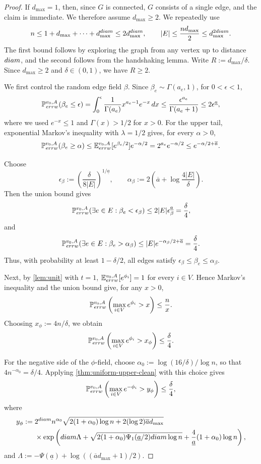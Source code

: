 \documentclass[10pt,a4paper]{amsart}
\newcommand{\E}{\mathbb{E}}
\newcommand{\Eerrw}{\E_{\textnormal{errw}}}
\renewcommand{\P}{\mathbb{P}}
\newcommand{\Perrw}{\P_{\textnormal{errw}}}
\newcommand{\diam}{\textnormal{diam}}
\begin{document}
\begin{proof}
If $d_{\max}=1$, then, since $G$ is connected, $G$ consists of a single edge, and the claim is immediate. We therefore assume $d_{\max}\ge2$. We repeatedly use
\[
n\le 1+d_{\max}+\cdots+d_{\max}^{\diam}\le 2d_{\max}^{\diam},
\qquad
|E|\le \frac{nd_{\max}}{2}\le d_{\max}^{2\diam}.
\]
The first bound follows by exploring the graph from any vertex up to distance $\diam$, and the second follows from the handshaking lemma. Write $R:=d_{\max}/\delta$. Since $d_{\max}\ge2$ and $\delta\in(0,1)$, we have $R\ge2$.

We first control the random edge field $\beta$. Since $\beta_e\sim\Gamma(a_e,1)$, for $0<\epsilon<1$,
\[
\Perrw^{v_0,A}(\beta_e\le \epsilon)
=
\int_0^\epsilon \frac{1}{\Gamma(a_e)}x^{a_e-1}e^{-x}\,dx
\le
\frac{\epsilon^{a_e}}{\Gamma(a_e+1)}
\le
2\epsilon^{\underline a},
\]
where we used $e^{-x}\le1$ and $\Gamma(x)>1/2$ for $x>0$. For the upper tail, exponential Markov's inequality with $\lambda=1/2$ gives, for every $\alpha>0$,
\[
\Perrw^{v_0,A}(\beta_e\ge\alpha)
\le
\Eerrw^{v_0,A}[e^{\beta_e/2}]e^{-\alpha/2}
=
2^{a_e}e^{-\alpha/2}
\le
e^{-\alpha/2+\overline a}.
\]

Choose
\[
\epsilon_\beta:=\left(\frac{\delta}{8|E|}\right)^{1/\underline a},
\qquad
\alpha_\beta:=2\left(\overline a+\log\frac{4|E|}{\delta}\right).
\]
Then the union bound gives
\[
\Perrw^{v_0,A}(\exists e\in E:\beta_e<\epsilon_\beta)
\le
2|E|\epsilon_\beta^{\underline a}
=
\frac{\delta}{4},
\]
and
\[
\Perrw^{v_0,A}(\exists e\in E:\beta_e>\alpha_\beta)
\le
|E|e^{-\alpha_\beta/2+\overline a}
=
\frac{\delta}{4}.
\]
Thus, with probability at least $1-\delta/2$, all edges satisfy $\epsilon_\beta\le\beta_e\le\alpha_\beta$.

Next, by \cref{lem:unit} with $t=1$, $\Eerrw^{v_0, A}[e^{\phi_i}]=1$ for every $i\in V$. Hence Markov's inequality and the union bound give, for any $x>0$,
\[
\Perrw^{v_0,A}\left(\max_{i\in V}e^{\phi_i}>x\right)
\le
\frac{n}{x}.
\]
Choosing $x_\phi:=4n/\delta$, we obtain
\[
\Perrw^{v_0,A}\left(\max_{i\in V}e^{\phi_i}>x_\phi\right)
\le
\frac{\delta}{4}.
\]

For the negative side of the $\phi$-field, choose $\alpha_0:=\log(16/\delta)/\log n$, so that $4n^{-\alpha_0}=\delta/4$. Applying \cref{thm:uniform-upper-clean} with this choice gives
\[
\Perrw^{v_0,A}\left(\max_{i\in V}e^{-\phi_i}>y_\phi\right)
\le
\frac{\delta}{4},
\]
where
\[
\begin{aligned}
y_\phi
:={}&
2^{\diam}n^{\alpha_0}
\sqrt{2(1+\alpha_0)\log n+2(\log2)\overline a d_{\max}} \\
&\times
\exp\left(
\diam\Lambda
+
\sqrt{2(1+\alpha_0)\Psi_1(\underline a/2)\diam\log n}
+
\frac{4}{\underline a}(1+\alpha_0)\log n
\right),
\end{aligned}
\]
and $\Lambda:=-\Psi(\underline a)+\log((\overline a d_{\max}+1)/2)$.


\end{proof}
\end{document}
